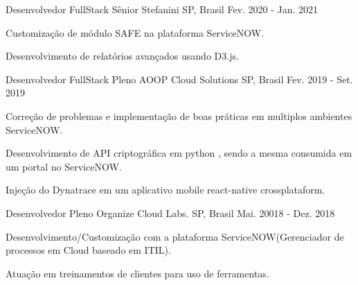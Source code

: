 \begin{cventries}
     \cventry
    {Desenvolvedor FullStack Sênior} %
    {Stefanini} %
    {SP, Brasil} %
    {Fev. 2020 - Jan. 2021} %
    {
    	\begin{cvitems} %
    		\item {Customização de módulo SAFE na plataforma ServiceNOW.}
    		\item {Desenvolvimento de relatórios avançados usando D3.js.}    		
    	\end{cvitems}
    }
    \cventry
    {Desenvolvedor FullStack Pleno} %
    {AOOP Cloud Solutions} %
    {SP, Brasil} %
    {Fev. 2019 - Set. 2019} %
    {
      \begin{cvitems} %
        \item {Correção de problemas e implementação de boas práticas em multiplos ambientes ServiceNOW.}
        \item {Desenvolvimento de API criptográfica em python , sendo a mesma consumida em um portal no ServiceNOW.}
        \item {Injeção do Dynatrace em um aplicativo mobile react-native crossplataform.}
      \end{cvitems}
    }   
	\cventry
	{Desenvolvedor Pleno} %
	{Organize Cloud Labs.} %
	{SP, Brasil} %
	{Mai. 20018 - Dez. 2018} %
	{
		\begin{cvitems} %
			\item {Desenvolvimento/Customização com a plataforma ServiceNOW(Gerenciador de processos em Cloud baseado em ITIL).}
			\item {Atuação em treinamentos de clientes para uso de ferramentas.}
		\end{cvitems}
	}

\end{cventries}

